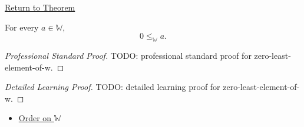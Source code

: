 \newpage
{}
\label{prf:zero-least-element-of-w}

\begin{remark*}[Return]
\hyperref[thm:zero-least-element-of-w]{Return to Theorem}
\end{remark*}

\begin{theorem*}
For every $a\in\mathbb{W}$,
\[
0\leq_{\mathbb{W}}a.
\]
\end{theorem*}

\begin{proof}[Professional Standard Proof]
\LRAProofBodyStart
TODO: professional standard proof for zero-least-element-of-w.
\end{proof}

\begin{proof}[Detailed Learning Proof]
\LRAProofBodyStart
TODO: detailed learning proof for zero-least-element-of-w.
\end{proof}

\begin{remark*}
\end{remark*}

\begin{dependencies}
\begin{itemize}
  \item \hyperref[def:order-on-w]{Order on $\mathbb{W}$}
\end{itemize}
\end{dependencies}

\clearpage
